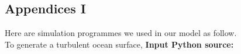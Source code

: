 \documentclass{mcmthesis}
\begin{document}



\newpage
\begin{appendices}

  \section{Appendices I}

    Here are simulation programmes we used in our model as follow.\\
    To generate a turbulent ocean surface,
    \textbf{\textcolor[rgb]{0.98,0.00,0.00}{Input Python source:}}


\end{appendices}
\end{document}
